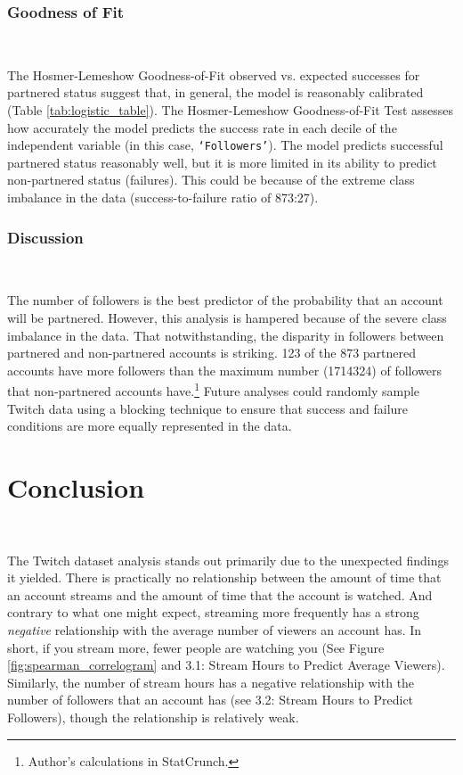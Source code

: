 \documentclass[12pt]{article}
\begin{document}
\subsubsection{Goodness of Fit}\

The Hosmer-Lemeshow Goodness-of-Fit observed vs. expected successes for partnered status suggest that, in general, the model is reasonably calibrated (Table \ref{tab:logistic_table}). The Hosmer-Lemeshow Goodness-of-Fit Test assesses how accurately the model predicts the success rate in each decile of the independent variable (in this case, \texttt{`Followers'}). The model predicts successful partnered status reasonably well, but it is more limited in its ability to predict non-partnered status (failures). This could be because of the extreme class imbalance in the data (success-to-failure ratio of 873:27).

\subsubsection{Discussion}\

The number of followers is the best predictor of the probability that an account will be partnered. However, this analysis is hampered because of the severe class imbalance in the data. That notwithstanding, the disparity in followers between partnered and non-partnered accounts is striking. 123 of the 873 partnered accounts have more followers than the maximum number (1714324) of followers that non-partnered accounts have.\footnote{Author's calculations in StatCrunch.} Future analyses could randomly sample Twitch data using a blocking technique to ensure that success and failure conditions are more equally represented in the data.


\section{Conclusion}\

The Twitch dataset analysis stands out primarily due to the unexpected findings it yielded. There is practically no relationship between the amount of time that an account streams and the amount of time that the account is watched. And contrary to what one might expect, streaming more frequently has a strong \emph{negative} relationship with the average number of viewers an account has. In short, if you stream more, fewer people are watching you (See Figure \ref{fig:spearman_correlogram} and 3.1: Stream Hours to Predict Average Viewers). Similarly, the number of stream hours has a negative relationship with the number of followers that an account has (see 3.2: Stream Hours to Predict Followers), though the relationship is relatively weak.
\end{document}
